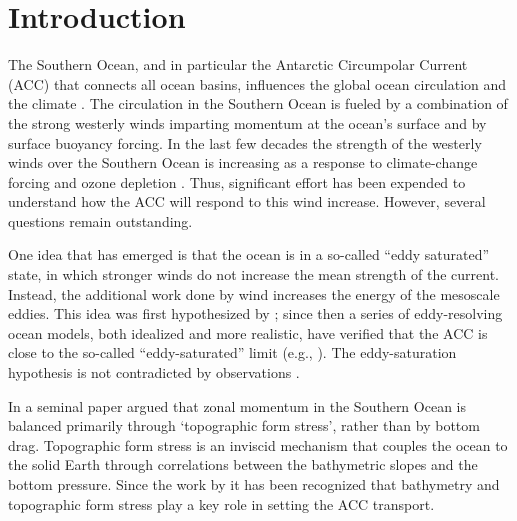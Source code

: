 \documentclass{agujournal2019}
\begin{document}
\section{Introduction}

The Southern Ocean, and in particular the Antarctic Circumpolar Current (ACC) that connects all  ocean basins, influences the global ocean circulation and the climate \cite{Toggweiler-etal-2006, Talley-2013, Ferrari-etal-2014}. The circulation in the Southern Ocean is fueled by a combination of the strong westerly winds imparting momentum at the ocean's surface and by surface buoyancy forcing. In the last few decades the strength of the westerly winds over the Southern Ocean is increasing as a response to climate-change forcing and ozone depletion \cite{Marshall-2003,Swart-Fyfe-2012,Bracegirdle-etal-2013,Farneti-etal-2015}. Thus, significant effort has been expended to understand how the ACC will respond to this wind increase. However, several questions remain outstanding.


One idea that has emerged is that the ocean is in a so-called ``eddy saturated'' state, in which stronger winds do not increase the mean strength of the current. {\color{black}Instead, the additional work done by wind increases the energy of the mesoscale eddies.} This idea was first hypothesized by ; since then a series of eddy-resolving ocean models, both idealized and more realistic, have verified that the ACC is close to the so-called ``eddy-saturated'' limit (e.g., ). {\color{black}The eddy-saturation hypothesis is not contradicted by observations \cite{Boning-etal-2008, Firing-etal-2011, Hogg-etal-2015}.}


In a seminal paper  argued that zonal momentum in the Southern Ocean is balanced primarily through `topographic form stress', rather than by bottom drag. Topographic form stress is an inviscid mechanism that couples the ocean to the solid Earth through correlations between the bathymetric slopes and the bottom pressure. Since the work by  it has been recognized that bathymetry and topographic form stress play a key role in setting the ACC transport. 
\end{document}
